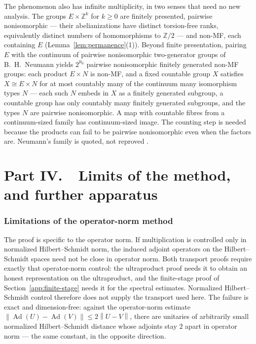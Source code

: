 \documentclass[11pt]{amsart}
\newcommand{\leanverified}[2]{\ignorespaces}
\theoremstyle{definition}
\theoremstyle{remark}
\theoremstyle{plain}
\newcommand{\Ad}{\operatorname{Ad}}
\newcommand{\opnorm}[1]{\left\lVert #1\right\rVert}
\begin{document}
The phenomenon also has infinite multiplicity, in two senses that need
no new analysis.  The groups $E\times\mathbb Z^{k}$ for $k\ge0$ are
finitely presented, pairwise nonisomorphic --- their abelianizations
have distinct torsion-free ranks, equivalently distinct numbers of
homomorphisms to $\mathbb Z/2$ --- and non-MF, each containing $E$
(Lemma~\ref{lem:permanence}(1)).
\leanverified{Sofic/ProductMultiplicity}{GroupApproximation.ProductMultiplicity.manuscriptInfiniteMultiplicity}
Beyond finite presentation, pairing $E$
with the continuum of pairwise nonisomorphic two-generator groups of
B.~H.~Neumann \cite{Neumann37} yields $2^{\aleph_0}$ pairwise
nonisomorphic finitely generated non-MF groups: each product
$E\times N$ is non-MF, and a fixed countable group $X$ satisfies
$X\cong E\times N$ for at most countably many of the continuum many
isomorphism types $N$ --- each such $N$ embeds in $X$ as a finitely
generated subgroup, a countable group has only countably many finitely
generated subgroups, and the types $N$ are pairwise nonisomorphic.  A
map with countable fibres from a continuum-sized family has
continuum-sized image.  The counting step is needed because the
products can fail to be pairwise nonisomorphic even when the factors
are.  Neumann's family is quoted, not reproved \cite{Neumann37}.
\leanverified{Sofic/ContinuumMultiplicity}{GroupApproximation.ContinuumMultiplicity.manuscriptContinuumMultiplicity}

\clearpage
\part*{Part IV.\ \ Limits of the method, and further apparatus}

\section{Limitations of the operator-norm method}\label{sec:limits}

The proof is specific to the operator norm.  If multiplication
is controlled only in normalized Hilbert--Schmidt norm, the induced adjoint
operators on the Hilbert--Schmidt spaces need not be close in operator norm.
Both transport proofs require exactly that operator-norm control: the
ultraproduct proof needs it to obtain an honest representation on the
ultraproduct, and the finite-stage proof of
Section~\ref{app:finite-stage} needs it for the spectral estimates.
Normalized Hilbert--Schmidt control therefore does not supply the
transport used here.  The failure is exact and dimension-free: against
the operator-norm estimate $\opnorm{\Ad(U)-\Ad(V)}\le2\opnorm{U-V}$,
there are unitaries of arbitrarily small normalized Hilbert--Schmidt
distance whose adjoints stay $2$ apart in operator norm --- the same
constant, in the opposite direction.
\leanverified{Sofic/HilbertSchmidtAdjointGap}{GroupApproximation.HilbertSchmidtAdjointGap.exists_hsClose_adjointFar}
\end{document}
